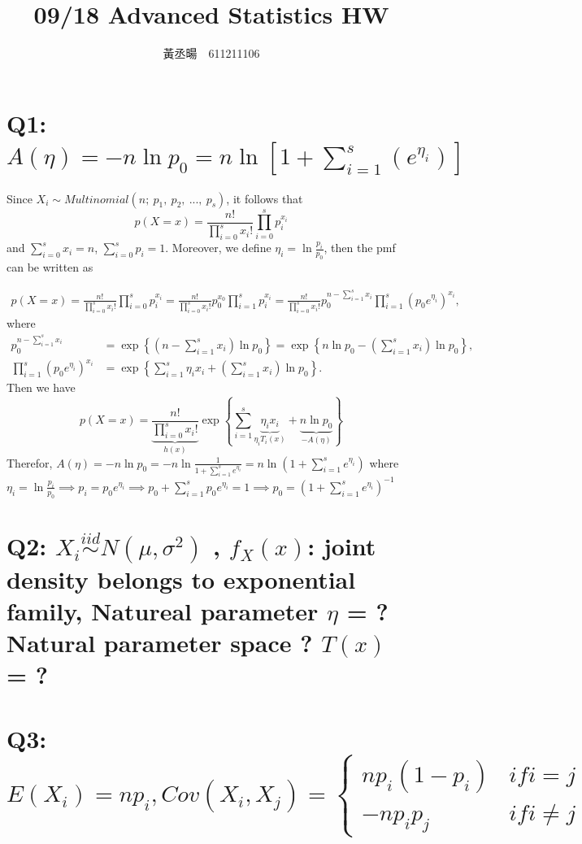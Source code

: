 \documentclass[a4paper, 12pt]{article}  %
\title{09/18 Advanced Statistics HW}
\author{黃丞暘　611211106}
\date{}
\begin{document}
\maketitle %

\section*{Q1: $A(\eta)=-n\ln p_0=n\ln[1+\displaystyle\sum_{i=1}^s(e^{\eta_i})]$}
Since  $X_i {\sim}Multinomial(n;\ p_1,\ p_2,\ ...,\ p_s)$, it follows that   
$$p(X=x)=\frac{n!}{\displaystyle\prod_{i=0}^sx_i!}\prod_{i=0}^sp_i^{x_i}$$ 
and 
$\displaystyle\sum_{i=0}^sx_i=n$, 
$\displaystyle\sum_{i=0}^sp_i=1$. 
Moreover, we define $\eta_i=\ln\frac{p_i}{p_0}$, then the pmf can be written as 

\begin{align*}
p(X=x)
=\frac{n!}{\displaystyle\prod_{i=0}^sx_i!}\prod_{i=0}^sp_i^{x_i}
=\frac{n!}{\displaystyle\prod_{i=0}^sx_i!}p_0^{x_0}\prod_{i=1}^sp_i^{x_i}
=\frac{n!}{\displaystyle\prod_{i=0}^sx_i!}p_0^{n-\sum_{i=1}^sx_i}\prod_{i=1}^s(p_0e^{\eta_i})^{x_i},
\end{align*}
where
\[
\begin{aligned}
p_0^{n-\sum_{i=1}^sx_i}
&= \exp\left\{(n-\sum_{i=1}^sx_i)\ln p_0\right\}=\exp\left\{n\ln{p_0}-(\sum_{i=1}^sx_i)\ln{p_0}\right\}, \\
\prod_{i=1}^s (p_0 e^{\eta_i})^{x_i}
&= \exp\left\{\sum_{i=1}^s\eta_ix_i+(\sum_{i=1}^sx_i)\ln{p_0}\right\}.
\end{aligned}
\]
Then we have
$$
p(X=x)=\underbrace{\frac{n!}{\displaystyle\prod_{i=0}^sx_i!}}_{h(x)}
\exp\left\{\sum_{i=1}^s\underbrace{\eta_i x_i}_{\eta_i T_i(x)}
+\underbrace{n\ln p_0}_{-A(\eta)}\right\}
$$
Therefor, $A(\eta)=-n\ln{p_0}=-n\ln \frac{1}{1+\sum_{i=1}^s e^{\eta_i}}=n\ln (1+\displaystyle\sum_{i=1}^se^{\eta_i})$
where $\eta_i=\ln\frac{p_i}{p_0}
\implies p_i=p_0e^{\eta_i}
\implies \displaystyle p_0+\sum_{i=1}^sp_0e^{\eta_i}=1
\implies p_0=(1+\sum_{i=1}^se^{\eta_i})^{-1}$

\section*{Q2: $X_i \overset{iid}{\sim} N(\mu, \sigma^2)$
, $f_X(x)$: joint density belongs to exponential family, Natureal parameter $\eta$ = ?
Natural parameter space ? $T(x)$ = ?}



\section*{Q3: $E(X_i)=np_i, Cov(X_i, X_j)=
\begin{cases}
np_i(1-p_i) &if　i=j \\
-np_ip_j &if　i\not=j 
\end{cases}$}
\end{document}
